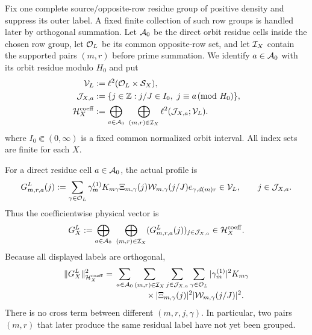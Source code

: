 Fix one complete source/opposite-row residue group of positive density and
suppress its outer label.  A fixed finite collection of such row groups is
handled later by orthogonal summation.  Let \(\mathcal A_0\) be the direct orbit
residue cells inside the chosen row group, let \(\mathcal O_L\) be its common
opposite-row set, and let \(\mathcal I_X\) contain the supported pairs \((m,r)\)
before prime summation.  We identify \(a\in\mathcal A_0\) with its orbit
residue modulo \(H_0\) and put
\begin{equation}
 \begin{aligned}
 \mathcal V_L&:=\ell^2(\mathcal O_L\times\mathcal S_X),\\
 \mathcal J_{X,a}&:=\{j\in\mathbb Z:j/J\in I_0,
                    \ j\equiv a\!\!\pmod {H_0}\},\\
 \mathcal H_X^{\rm coeff}
 &:=\bigoplus_{a\in\mathcal A_0}\ \bigoplus_{(m,r)\in\mathcal I_X}
      \ell^2(\mathcal J_{X,a};\mathcal V_L).
 \end{aligned}
 \label{eq:tpc52-coefficient-space}
\end{equation}
where \(I_0\Subset(0,\infty)\) is a fixed common normalized orbit
interval.  All index sets are finite for each \(X\).

For a direct residue cell \(a\in\mathcal A_0\), the actual profile is
\begin{equation}
 G_{m,r,a}^{L}(j)
 :=\sum_{\gamma\in\mathcal O_L}
   \gamma_m^{(1)}K_{m\gamma}
   \Xi_{m,\gamma}(j)\mathcal W_{m,\gamma}(j/J)
   e_{\gamma,d(m)r}\in\mathcal V_L,
 \qquad j\in\mathcal J_{X,a}.
 \label{eq:tpc52-actual-vector-profile}
\end{equation}
Thus the coefficientwise physical vector is
\begin{equation}
 G_X^L:=\bigoplus_{a\in\cA_0}\ \bigoplus_{(m,r)\in\cI_X}
             (G_{m,r,a}^{L}(j))_{j\in\cJ_{X,a}}
 \in\cH_X^{\rm coeff}.
 \label{eq:tpc52-actual-coefficient-vector}
\end{equation}
Because all displayed labels are orthogonal,
\begin{align}
 \|G_X^L\|_{\mathcal H_X^{\rm coeff}}^2
 &={}
 \sum_{a\in\mathcal A_0}\sum_{(m,r)\in\mathcal I_X}
 \sum_{j\in\mathcal J_{X,a}}
 \sum_{\gamma\in\mathcal O_L}
 |\gamma_m^{(1)}|^2K_{m\gamma}
 \notag\\[-2pt]
 &\hspace{5em}\times
 |\Xi_{m,\gamma}(j)|^2
 |\mathcal W_{m,\gamma}(j/J)|^2.
 \label{eq:tpc52-exact-physical-energy}
\end{align}
There is no cross term between different \((m,r,j,\gamma)\).  In
particular, two pairs \((m,r)\) that later produce the same residual
label have not yet been grouped.

